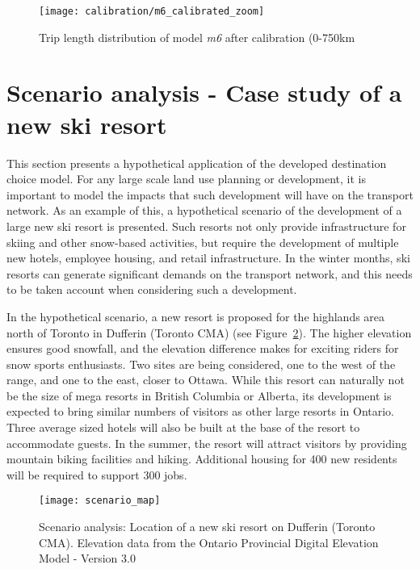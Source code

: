 \begin{figure}[H]
\centering
\texttt{[image: calibration/m6\_calibrated\_zoom]}
\caption{Trip length distribution of model \textit{m6} after calibration (0-750km}
\label{fig:overall-calibration-zoom}
\end{figure}

\section{Scenario analysis - Case study of a new ski resort}
\label{scenario-analysis}

This section presents a hypothetical application of the developed destination choice model. For any large scale land use planning or development, it is important to model the impacts that such development will have on the transport network. As an example of this, a hypothetical scenario of the development of a large new ski resort is presented. Such resorts not only provide infrastructure for skiing and other snow-based activities, but require the development of multiple new hotels, employee housing, and retail infrastructure. In the winter months, ski resorts can generate significant demands on the transport network, and this needs to be taken account when considering such a development.

In the hypothetical scenario, a new resort is proposed for the highlands area north of Toronto  in Dufferin (Toronto CMA) (see Figure~\ref{fig:scenario-map}). The higher elevation ensures good snowfall, and the elevation difference makes for exciting riders for snow sports enthusiasts. Two sites are being considered, one to the west of the range, and one to the east, closer to Ottawa. While this resort can naturally not be the size of mega resorts in British Columbia or Alberta, its development is expected to bring similar numbers of visitors as other large resorts in Ontario. Three average sized hotels will also be built at the base of the resort to accommodate guests. In the summer, the resort will attract visitors by providing mountain biking facilities and hiking. Additional housing for 400 new residents will be required to support 300 jobs.

\begin{figure}[H]
\centering
\texttt{[image: scenario\_map]}
\caption{Scenario analysis: Location of a new ski resort on Dufferin (Toronto CMA). Elevation data from the Ontario Provincial Digital Elevation Model - Version 3.0 }
\label{fig:scenario-map}
\end{figure}

